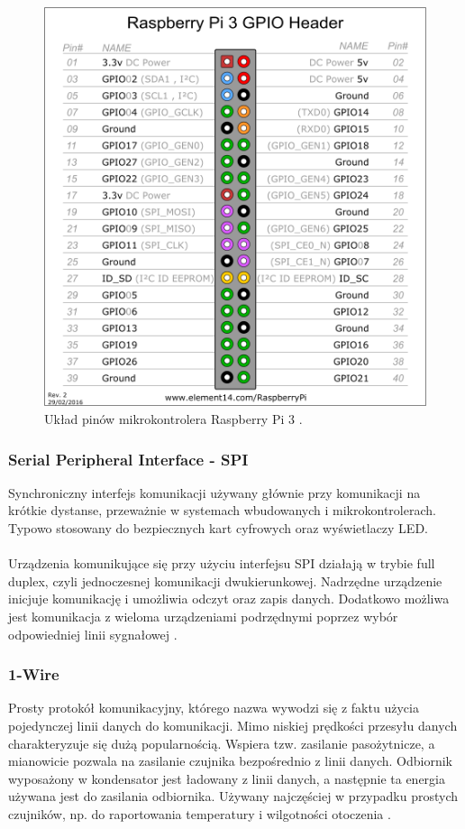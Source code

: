 \documentclass[12pt]{report}
\let\Oldsubsubsection\subsubsection
\renewcommand{\subsubsection}{\FloatBarrier\Oldsubsubsection}
\begin{document}
{\begin{figure}[h]
	\centering
	\includegraphics[width=1\textwidth]{images/pi3pinout.png}
	\caption{Układ pinów mikrokontrolera Raspberry Pi 3 \cite{pi3pinoutImg}.}
\end{figure}

\subsubsection{Serial Peripheral Interface - SPI}
Synchroniczny interfejs komunikacji używany głównie przy komunikacji na krótkie dystanse, przeważnie w systemach wbudowanych i mikrokontrolerach. Typowo stosowany do bezpiecznych kart cyfrowych oraz wyświetlaczy LED. \\ \\
Urządzenia komunikujące się przy użyciu interfejsu SPI działają w trybie full duplex, czyli jednoczesnej komunikacji dwukierunkowej. Nadrzędne urządzenie inicjuje komunikację i umożliwia odczyt oraz zapis danych. Dodatkowo możliwa jest komunikacja z wieloma urządzeniami podrzędnymi poprzez wybór odpowiedniej linii sygnałowej \cite{raspberry}.

\subsubsection{1-Wire}
Prosty protokół komunikacyjny, którego nazwa wywodzi się z faktu użycia pojedynczej linii danych do komunikacji. Mimo niskiej prędkości przesyłu danych charakteryzuje się dużą popularnością. Wspiera tzw. zasilanie pasożytnicze, a mianowicie pozwala na zasilanie czujnika bezpośrednio z linii danych. Odbiornik wyposażony w kondensator jest ładowany z linii danych, a następnie ta energia używana jest do zasilania odbiornika. Używany najczęściej w przypadku prostych czujników, np. do raportowania temperatury i wilgotności otoczenia \cite{raspberry}.

}
\end{document}
